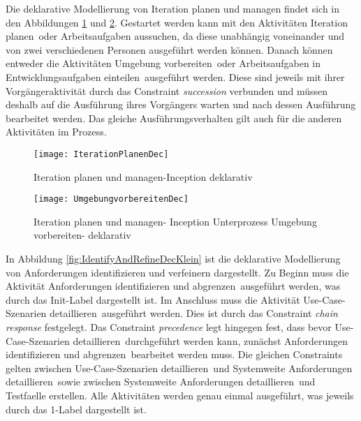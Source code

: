 Die deklarative Modellierung von Iteration planen und managen findet sich in den Abbildungen \ref{fig:IterationPlanenDec} und \ref{fig:UmgebungVorbereitenDec}. Gestartet werden kann mit den Aktivitäten \grqq Iteration planen\grqq \ oder \grqq Arbeitsaufgaben aussuchen\grqq, da diese unabhängig voneinander und von zwei verschiedenen Personen ausgeführt werden können.\newline
Danach können entweder die Aktivitäten \grqq Umgebung vorbereiten\grqq \ oder \grqq Arbeitsaufgaben in Entwicklungsaufgaben einteilen\grqq \ ausgeführt werden. Diese sind jeweils mit ihrer Vorgängeraktivität durch das Constraint \textit{succession} verbunden und müssen deshalb auf die Ausführung ihres Vorgängers warten und nach dessen Ausführung bearbeitet werden.\newline
Das gleiche Ausführungsverhalten gilt auch für die anderen Aktivitäten im Prozess. 



\begin{figure}[htp]
\begin{center}
  \texttt{[image: IterationPlanenDec]} %
  \caption{Iteration planen und managen-Inception deklarativ}
  \label{fig:IterationPlanenDec}
\end{center}
\end{figure}

\begin{figure}[htp]
\begin{center}
  \texttt{[image: UmgebungvorbereitenDec]} %
  \caption{Iteration planen und managen- Inception Unterprozess Umgebung vorbereiten- deklarativ}
  \label{fig:UmgebungVorbereitenDec}
\end{center}
\end{figure}


In Abbildung \ref{fig:IdentifyAndRefineDecKlein} ist die deklarative Modellierung von Anforderungen identifizieren und verfeinern dargestellt.\newline
Zu Beginn muss die Aktivität \grqq Anforderungen identifizieren und abgrenzen\grqq \ ausgeführt werden, was durch das Init-Label dargestellt ist. Im Anschluss muss die Aktivität \grqq Use-Case-Szenarien detaillieren\grqq \ ausgeführt werden. Dies ist durch das Constraint \textit{chain response} festgelegt. Das Constraint \textit{precedence} legt hingegen fest, dass bevor \grqq Use-Case-Szenarien detaillieren\grqq \ durchgeführt werden kann, zunächst \grqq Anforderungen identifizieren und abgrenzen\grqq \ bearbeitet werden muss. Die gleichen Constraints gelten zwischen \grqq Use-Case-Szenarien detaillieren\grqq \ und \grqq Systemweite Anforderungen detaillieren\grqq \ sowie zwischen \grqq Systemweite Anforderungen detaillieren\grqq \ und \grqq Testfaelle erstellen\grqq. Alle Aktivitäten werden genau einmal ausgeführt, was jeweils durch das 1-Label dargestellt ist. 

